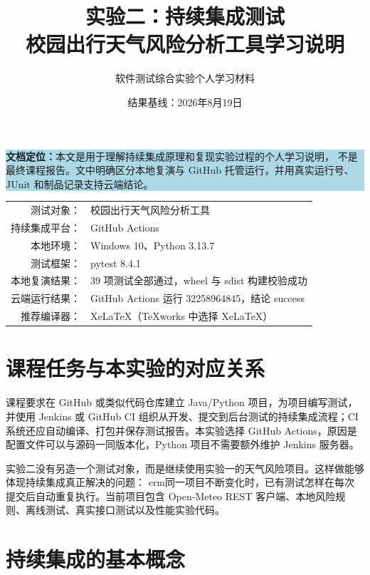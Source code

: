 \documentclass[UTF8,zihao=-4,a4paper]{ctexart}
\title{\heiti\Huge 实验二：持续集成测试\\[0.7em]
\Large 校园出行天气风险分析工具学习说明}
\author{软件测试综合实验\quad 个人学习材料}
\date{结果基线：2026年8月19日}
\begin{document}
\maketitle
\thispagestyle{empty}

\begin{center}
\begin{minipage}{0.88\textwidth}
\colorbox{LightBlue}{\parbox{0.94\textwidth}{
\textbf{文档定位：}本文是用于理解持续集成原理和复现实验过程的个人学习说明，
不是最终课程报告。文中明确区分本地复演与 GitHub 托管运行，并用真实运行号、JUnit 和制品记录支持云端结论。
}}
\end{minipage}
\end{center}

\vfill
\begin{center}
\begin{tabular}{rl}
测试对象：& 校园出行天气风险分析工具 \\
持续集成平台：& GitHub Actions \\
本地环境：& Windows 10、Python 3.13.7 \\
测试框架：& pytest 8.4.1 \\
本地复演结果：& 39 项测试全部通过，wheel 与 sdist 构建校验成功 \\
云端运行结果：& GitHub Actions 运行 32258964845，结论 success \\
推荐编译器：& XeLaTeX（TeXworks 中选择 XeLaTeX）
\end{tabular}
\end{center}

\clearpage
\tableofcontents
\clearpage

\section{课程任务与本实验的对应关系}

课程要求在 GitHub 或类似代码仓库建立 Java/Python 项目，为项目编写测试，并使用 Jenkins 或 GitHub CI 组织从开发、提交到后台测试的持续集成流程；CI 系统还应自动编译、打包并保存测试报告。本实验选择 GitHub Actions，原因是配置文件可以与源码一同版本化，Python 项目不需要额外维护 Jenkins 服务器。

实验二没有另造一个测试对象，而是继续使用实验一的天气风险项目。这样做能够体现持续集成真正解决的问题：	erm{同一项目不断变化时，已有测试怎样在每次提交后自动重复执行}。当前项目包含 Open-Meteo REST 客户端、本地风险规则、离线测试、真实接口测试以及性能实验代码。

\section{持续集成的基本概念}
\end{document}
